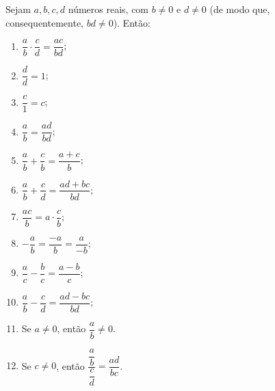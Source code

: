 \begin{proposition}
    Sejam $a, b, c, d$ números reais, com $b\neq 0$ e $d\neq 0$ (de modo que, consequentemente, $bd\neq 0$).
    Então:
    \begin{enumerate}[label=(\alph*)]
        \item $\dfrac{a}{b}\cdot \dfrac{c}{d} = \dfrac{ac}{bd}$;
        \item $\dfrac{d}{d}=1$;
        \item $\dfrac{c}{1} = c$;
        \item $\dfrac{a}{b} = \dfrac{ad}{bd}$;
        \item $\dfrac{a}{b} + \dfrac{c}{b} = \dfrac{a+c}{b}$;
        \item $\dfrac{a}{b} + \dfrac{c}{d} = \dfrac{ad + bc}{bd}$;
        \item $\dfrac{ac}{b} = a\cdot \dfrac{c}{b}$;
        \item $- \dfrac{a}{b} = \dfrac{-a}{b} = \dfrac{a}{-b}$;
        \item $\dfrac{a}{c} - \dfrac{b}{c} = \dfrac{a-b}{c}$;
        \item $\dfrac{a}{b} - \dfrac{c}{d} = \dfrac{ad - bc}{bd}$;
        \item Se $a\neq 0$, então $\dfrac{a}{b}\neq 0$.
        \item Se $c\neq 0$, então $\dfrac{\dfrac{a}{b}}{\dfrac{c}{d}} = \dfrac{ad}{bc}$.
    \end{enumerate}
\end{proposition}
